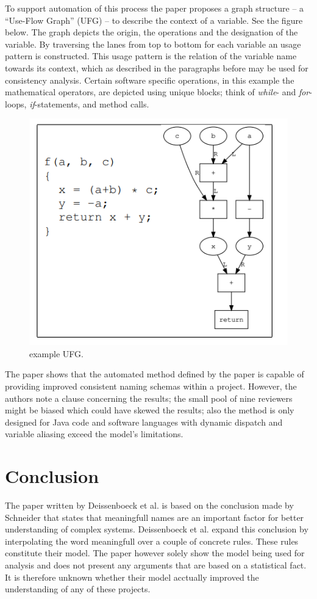 \documentclass[a4paper,12pt]{article}
\begin{document}
To support automation of this process the paper proposes a graph structure -- a “Use-Flow Graph” (UFG) -- to describe the context of a variable. See the figure below. The graph depicts the origin, the operations and the designation of the variable. By traversing the lanes from top to bottom for each variable an usage pattern is constructed. This usage pattern is the relation of the variable name towards its context, which as described in the paragraphs before may be used for consistency analysis. Certain software specific operations, in this example the mathematical operators, are depicted using unique blocks; think of \textit{while}- and \textit{for}-loops, \textit{if}-statements, and method calls. 

\begin{figure}[ht]
    \centering
    \includegraphics[width=0.7\linewidth]{ufg}
    \caption{example UFG.}
    \label{fig:ufg}
\end{figure}
\hfill
\FloatBarrier

    
The paper shows that the automated method defined by the paper is capable of providing improved consistent naming schemas within a project. However, the authors note a clause concerning the results; the small pool of nine reviewers might be biased which could have skewed the results; also the method is only designed for Java code and software languages with dynamic dispatch and variable aliasing exceed the model's limitations.

\section{Conclusion}
The paper written by Deissenboeck et al. is based on the conclusion made by Schneider that states that meaningfull names are an important factor for better understanding of complex systems. Deissenboeck et al. expand this conclusion by interpolating the word meaningfull over a couple of concrete rules. These rules constitute their model. The paper however solely show the model being used for analysis and does not present any arguments that are based on a statistical fact. It is therefore unknown whether their model acctually improved the understanding of any of these projects.
\end{document}
